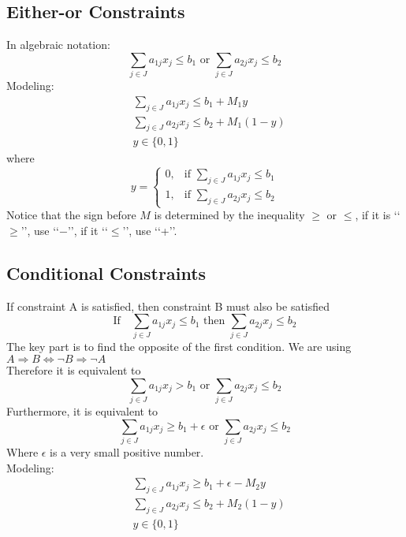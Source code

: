 			\subsection{Either-or Constraints}
				In algebraic notation: 
				\begin{equation}
					\sum_{j\in J} a_{1j} x_j \le b_1 \text{ or } \sum_{j\in J} a_{2j} x_j \le b_2 
				\end{equation}
				Modeling:
				\begin{align}
					& \sum_{j\in J} a_{1j} x_j \le b_1 + M_1y  \\
					& \sum_{j\in J} a_{2j} x_j \le b_2 + M_1(1-y)  \\
					& y \in \{0, 1\} 
				\end{align}
				where
				\begin{equation}y=\begin{cases}0, & \text{if }\sum_{j\in J} a_{1j} x_j \le b_1 \\ 1, & \text{if } \sum_{j\in J} a_{2j} x_j \le b_2\end{cases} \end{equation}
				Notice that the sign before $M$ is determined by the inequality $\ge$ or $\le$, if it is \lq\lq{}$\ge$\rq\rq{}, use \lq\lq{}$-$\rq\rq{}, if it \lq\lq{}$\le$\rq\rq{}, use \lq\lq{}+\rq\rq{}.
			
			\subsection{Conditional Constraints}
				If constraint A is satisfied, then constraint B must also be satisfied
				\begin{equation}
					\text{If} \quad \sum_{j\in J} a_{1j} x_j \le b_1 \text{ then } \sum_{j\in J} a_{2j} x_j \le b_2 
				\end{equation}
				The key part is to find the opposite of the first condition. We are using $A\Rightarrow B \Leftrightarrow \neg B \Rightarrow \neg A$\\
				Therefore it is equivalent to
				\begin{equation}
					\sum_{j\in J} a_{1j} x_j > b_1 \text{ or } \sum_{j\in J} a_{2j} x_j \le b_2 
				\end{equation}
				Furthermore, it is equivalent to
				\begin{equation}
					\sum_{j\in J} a_{1j} x_j \ge b_1 + \epsilon \text{ or } \sum_{j\in J} a_{2j} x_j \le b_2 
				\end{equation}
				Where $\epsilon$ is a very small positive number.\\
				Modeling:
				\begin{align}
					& \sum_{j\in J} a_{1j} x_j \ge b_1 + \epsilon -  M_2y  \\
					& \sum_{j\in J} a_{2j} x_j \le b_2 + M_2(1-y)  \\
					& y \in \{0, 1\} 
				\end{align}	
			
